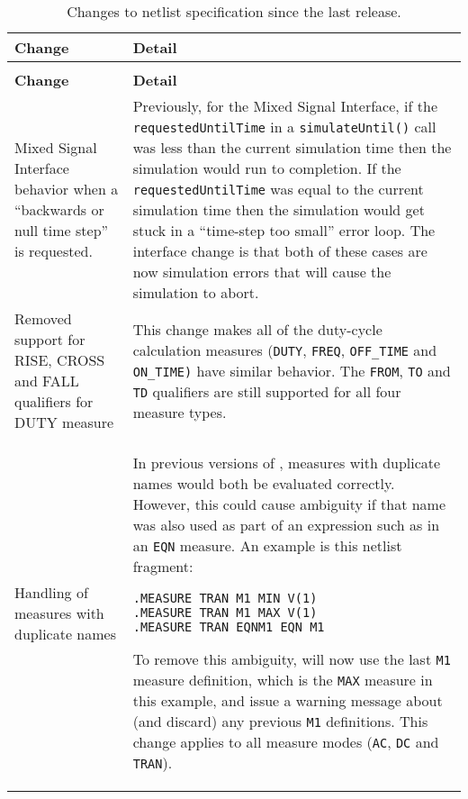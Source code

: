{
\small

\begin{longtable}[h] {>{\raggedright\small}m{2in}|>{\raggedright\let\\\tabularnewline\small}m{3.5in}}
  \caption{Changes to netlist specification since the last release.\label{newUsage}} \\ \hline
  \rowcolor{XyceDarkBlue}
  \color{white}\textbf{Change} &
  \color{white}\textbf{Detail} \\ \hline \endfirsthead
  \caption[]{Changes to netlist specification since the last release.\label{newUsage}} \\ \hline
  \rowcolor{XyceDarkBlue}
  \color{white}\textbf{Change} &
  \color{white}\textbf{Detail} \\ \hline \endhead

Mixed Signal Interface behavior when a ``backwards or null time step'' is requested.  &
Previously, for the Mixed Signal Interface, if the \texttt{requestedUntilTime}
in a \texttt{simulateUntil()} call was less than the current simulation time
then the \Xyce{} simulation would run to completion.  If the \texttt{requestedUntilTime}
was equal to the current simulation time then the simulation would get stuck in a
``time-step too small'' error loop.  The interface change is that both of these
cases are now simulation errors that will cause the \Xyce{} simulation to abort.
\\ \hline

Removed support for RISE, CROSS and FALL qualifiers for DUTY measure & This change
makes all of the duty-cycle calculation measures (\texttt{DUTY}, \texttt{FREQ},
\texttt{OFF\_TIME} and \texttt{ON\_TIME)} have similar behavior.  The
\texttt{FROM}, \texttt{TO} and \texttt{TD} qualifiers are still supported
for all four measure types.
\\ \hline

Handling of measures with duplicate names & In previous versions of \Xyce{},
measures with duplicate names would both be evaluated correctly.  However,
this could cause ambiguity if that name was also used as part of an
expression such as in an \texttt{EQN} measure.  An example is this
netlist fragment:
\begin{verbatim}
.MEASURE TRAN M1 MIN V(1)
.MEASURE TRAN M1 MAX V(1)
.MEASURE TRAN EQNM1 EQN M1
\end{verbatim}
To remove this ambiguity, \Xyce{} will now use the last \texttt{M1}
measure definition, which is the \texttt{MAX} measure in this example,
and issue a warning message about (and discard) any previous \texttt{M1}
definitions.  This change applies to all measure modes (\texttt{AC},
\texttt{DC} and \texttt{TRAN}).
\\ \hline

\end{longtable}
}
